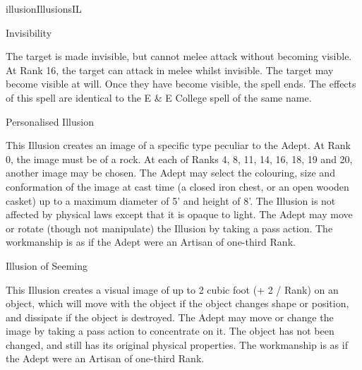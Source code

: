 \begin{college}[1.4]{illusion}{Illusions}{IL}
\begin{spell}[G-4]{Invisibility}

\begin{effects}
The target is made invisible, but cannot melee attack without becoming
visible. At Rank 16, the target can attack in melee whilst
invisible. The target may become visible at will. Once they have
become visible, the spell ends. The effects of this spell are
identical to the E \& E College spell of the same name.
\end{effects}
\end{spell}

\begin{spell}[G-5]{Personalised Illusion}

\begin{effects}
This Illusion creates an image of a specific type peculiar to the
Adept. At Rank 0, the image must be of a rock. At each of Ranks 4, 8,
11, 14, 16, 18, 19 and 20, another image may be chosen. The Adept may
select the colouring, size and conformation of the image at cast time
(\eg a closed iron chest, or an open wooden casket) up to a maximum
diameter of 5' and height of 8'. The Illusion is not affected by
physical laws except that it is opaque to light. The Adept may move or
rotate (though not manipulate) the Illusion by taking a pass
action. The workmanship is as if the Adept were an Artisan of
one-third Rank.
\end{effects}
\end{spell}

\begin{spell}[G-6]{Illusion of Seeming}

\begin{effects}
This Illusion creates a visual image of up to 2 cubic foot (+ 2 /
Rank) on an object, which will move with the object if the object
changes shape or position, and dissipate if the object is destroyed.
The Adept may move or change the image by taking a pass action to
concentrate on it. The object has not been changed, and still has its
original physical properties. The workmanship is as if the Adept were
an Artisan of one-third Rank.


\end{effects}
\end{spell}
\end{college}

